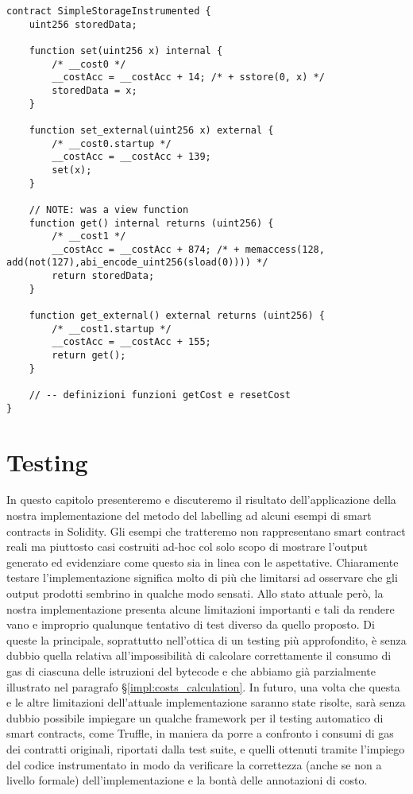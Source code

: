 \documentclass[12pt,a4paper,openright,oneside]{report}
\theoremstyle{definition}
\begin{document}
\begin{lstlisting}[language=Solidity,caption=Instrumentazione corretta di \ref{lst:simple_storage_solidity},label={lst:simple_storage_instrumentation_correct},frame=tlrb]
contract SimpleStorageInstrumented {
    uint256 storedData;

    function set(uint256 x) internal {
        /* __cost0 */
        __costAcc = __costAcc + 14; /* + sstore(0, x) */
        storedData = x;
    }

    function set_external(uint256 x) external {
        /* __cost0.startup */
        __costAcc = __costAcc + 139;
        set(x);
    }

    // NOTE: was a view function
    function get() internal returns (uint256) {
        /* __cost1 */
        __costAcc = __costAcc + 874; /* + memaccess(128, add(not(127),abi_encode_uint256(sload(0)))) */
        return storedData;
    }

    function get_external() external returns (uint256) {
        /* __cost1.startup */
        __costAcc = __costAcc + 155;
        return get();
    }
    
    // -- definizioni funzioni getCost e resetCost
}
\end{lstlisting}

\chapter{Testing}
In questo capitolo presenteremo e discuteremo il risultato dell'applicazione della nostra implementazione del metodo del labelling ad alcuni esempi di smart contracts in Solidity. Gli esempi che tratteremo non rappresentano smart contract reali ma piuttosto casi costruiti ad-hoc col solo scopo di mostrare l'output generato ed evidenziare come questo sia in linea con le aspettative. Chiaramente testare l'implementazione significa molto di pi\`{u} che limitarsi ad osservare che gli output prodotti sembrino in qualche modo sensati. Allo stato attuale per\`{o}, la nostra implementazione presenta alcune limitazioni importanti e tali da rendere vano e improprio qualunque tentativo di test diverso da quello proposto. Di queste la principale, soprattutto nell'ottica di un testing pi\`{u} approfondito, \`{e} senza dubbio quella relativa all'impossibilit\`{a} di calcolare correttamente il consumo di gas di ciascuna delle istruzioni del bytecode e che abbiamo gi\`{a} parzialmente illustrato nel paragrafo \S\ref{impl:costs_calculation}. In futuro, una volta che questa e le altre limitazioni dell'attuale implementazione saranno state risolte, sar\`{a} senza dubbio possibile impiegare un qualche framework per il testing automatico di smart contracts, come Truffle\cite{truffle}, in maniera da porre a confronto i consumi di gas dei contratti originali, riportati dalla test suite, e quelli ottenuti tramite l'impiego del codice instrumentato in modo da verificare la correttezza (anche se non a livello formale) dell'implementazione e la bont\`{a} delle annotazioni di costo.
\end{document}
